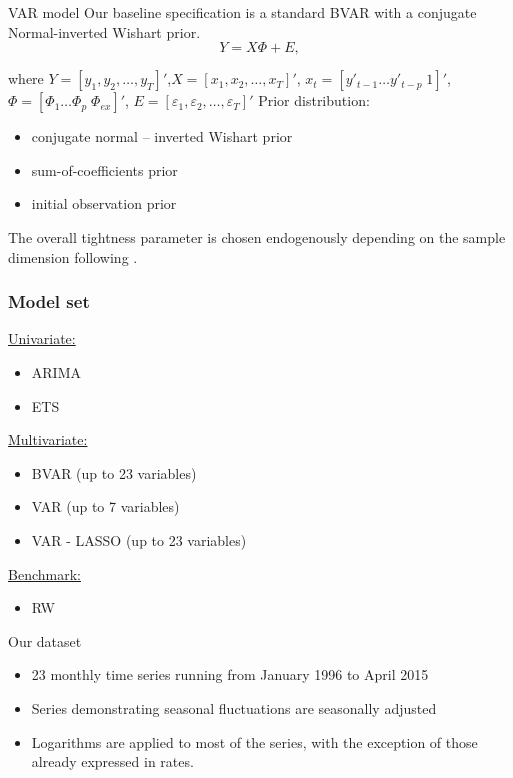 \documentclass{beamer} %
\begin{document}
\begin{frame}{VAR model}%
Our baseline specification is a standard BVAR with a conjugate Normal-inverted Wishart prior.
\begin{equation}
Y=X\Phi+E,\label{var}
\end{equation}

where $Y=[y_1, y_2,\ldots, y_T]'$,$X=[x_1, x_2,\ldots, x_T]'$, $x_t=[ y'_{t-1} \ldots  y'_{t-p} \; 1]'$,  $\Phi=[\Phi_1 \ldots \Phi_p \; \Phi_{ex}]'$, $E=[\varepsilon_1, \varepsilon_2,\ldots, \varepsilon_T]'$
Prior distribution:

\begin{itemize}
\item conjugate normal -- inverted Wishart prior
\item sum-of-coefficients prior
\item initial observation prior
\end{itemize}
The overall tightness parameter is chosen endogenously depending on the sample dimension following \cite{banbura_al_2010}.
\end{frame}

\begin{frame}
\frametitle{Model set}
\underline{Univariate:}
\begin{itemize}
\item ARIMA
\item ETS
\end{itemize}
\underline{Multivariate:}
\begin{itemize}
\item BVAR (up to 23 variables)
\item VAR (up to 7 variables)
\item VAR - LASSO (up to 23 variables)
\end{itemize}
\underline{Benchmark:}
\begin{itemize}
\item RW
\end{itemize}
\end{frame}


\begin{frame}{Our dataset}%
\begin{itemize}
\item 23 monthly time series running from January 1996 to April 2015
\item Series demonstrating seasonal fluctuations are seasonally adjusted
\item Logarithms are applied to most of the series, with the exception of those already expressed in rates.
\end{itemize}
\end{frame}
\end{document}
